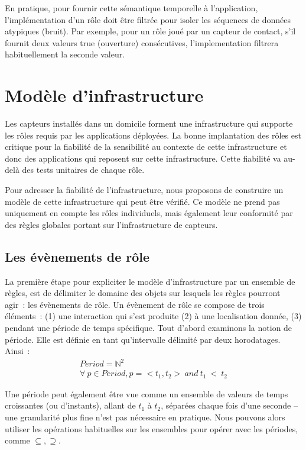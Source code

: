 En pratique, pour fournir cette sémantique temporelle à l'application, 
l'implémentation d'un rôle doit être filtrée pour isoler les séquences de 
données atypiques (bruit). Par exemple, pour un rôle joué par un capteur de 
contact, s'il fournit deux valeurs true (ouverture) consécutives, l'implementation
filtrera habituellement la seconde valeur.

\section{Modèle d'infrastructure}\label{seq:fiabilite:model}
Les capteurs installés dans un domicile forment une infrastructure qui supporte 
les rôles requis par les applications déployées. 
La bonne implantation des rôles est critique pour la fiabilité de la 
sensibilité au contexte de cette infrastructure et donc des applications qui 
reposent sur cette infrastructure. 
Cette fiabilité va au-delà des tests unitaires de chaque rôle.

Pour adresser la fiabilité de l'infrastructure, nous proposons de construire un 
modèle de cette infrastructure qui peut être vérifié. Ce modèle ne prend pas 
uniquement en compte les rôles individuels, mais également leur conformité par 
des règles globales portant sur l'infrastructure de capteurs.

\subsection{Les évènements de rôle}\label{archi:algebra} 
La première étape pour expliciter le modèle d'infrastructure par un
ensemble de règles, est de délimiter le domaine des objets sur lesquels les 
règles pourront agir~: les évènements de rôle. Un évènement de rôle se compose de trois 
éléments~: (1) une interaction qui s'est produite (2) à une localisation donnée, 
(3) pendant une période de temps spécifique. Tout d'abord examinons la notion 
de période. Elle est définie en tant qu'intervalle délimité par deux horodatages. 
Ainsi~: 
\begin{displaymath}\label{archi:algebra:period1}
 \begin{array}{c} 
  Period = \mathds{N}^2\\
    \forall~p \in Period, p = <t_1, t_2>~and~t_1~<~t_2
 \end{array}
\end{displaymath}

Une période peut également être vue comme un ensemble de valeurs
de temps croissantes (ou d'instants), allant de $t_1$ à $t_2$, séparées chaque 
fois d'une seconde -- une granularité plus fine n'est pas 
nécessaire en pratique. Nous pouvons alors utiliser les opérations habituelles sur 
les ensembles pour opérer avec les périodes, comme $\subseteq, \supseteq$.

